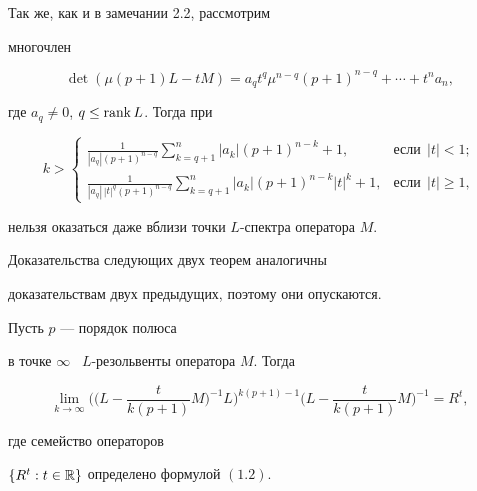 \begin{notes}


Так же, как и в замечании 2.2, рассмотрим


многочлен


$$


\det (\mu(p+1) L - t M) = a_q t^q \mu^{n-q}


(p+1)^{n-q} + \dotsb + t^n a_n,


$$


где $a_q\neq 0$, $q\le \operatorname{rank} L$. Тогда при


$$


k>


\begin{cases}


\displaystyle{\frac{1}{|a_q|(p+1)^{n-q}}}


\sum_{k=q+1}^{n} |a_k|(p+1)^{n-k} + 1,


& \text{если}\ \ |t|<1;\\[3mm]


\displaystyle{\frac{1}{|a_q|\,|t|^{q}(p+1)^{n-q}}}


\sum_{k=q+1}^{n} |a_k|(p+1)^{n-k} |t|^k+ 1,


& \text{если} \ \ |t|\ge 1,


\end{cases}


$$


нельзя оказаться даже вблизи точки $L$-спектра оператора $M$.


\end{notes}





Доказательства следующих двух теорем аналогичны


доказательствам двух предыдущих, поэтому они опускаются.








\begin{thms}


Пусть $p$ --- порядок полюса


в точке $\infty$ \ $L$-резольвенты оператора $M$. Тогда


\begin{equation}


\lim_{k\to\infty} \bigg(\bigg(L - \frac{t}{k(p+1)} M\bigg)^{-1}


L\bigg)^{k(p+1)-1}


\bigg(L - \frac{t}{k(p+1)} M\bigg)^{-1} = R^t,


\end{equation}


где семейство операторов


$\{R^t : t\in {\Bbb R}\}$   определено формулой $(1.2)$.


\end{thms}





